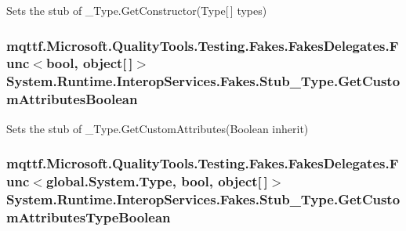 Sets the stub of \-\_\-\-Type.\-Get\-Constructor(\-Type\mbox{[}$\,$\mbox{]} types)

\hypertarget{class_system_1_1_runtime_1_1_interop_services_1_1_fakes_1_1_stub___type_acd63edf0bfa188ae04cbf8a2221e6792}{
\subsubsection[{Get\-Custom\-Attributes\-Boolean}]{\setlength{\rightskip}{0pt plus 5cm}mqttf.\-Microsoft.\-Quality\-Tools.\-Testing.\-Fakes.\-Fakes\-Delegates.\-Func$<$bool, object\mbox{[}$\,$\mbox{]}$>$ System.\-Runtime.\-Interop\-Services.\-Fakes.\-Stub\-\_\-\-Type.\-Get\-Custom\-Attributes\-Boolean}}\label{class_system_1_1_runtime_1_1_interop_services_1_1_fakes_1_1_stub___type_acd63edf0bfa188ae04cbf8a2221e6792}


Sets the stub of \-\_\-\-Type.\-Get\-Custom\-Attributes(\-Boolean inherit)

\hypertarget{class_system_1_1_runtime_1_1_interop_services_1_1_fakes_1_1_stub___type_ab929472be2f240ceda92abd43348cee6}{
\subsubsection[{Get\-Custom\-Attributes\-Type\-Boolean}]{\setlength{\rightskip}{0pt plus 5cm}mqttf.\-Microsoft.\-Quality\-Tools.\-Testing.\-Fakes.\-Fakes\-Delegates.\-Func$<$global.\-System.\-Type, bool, object\mbox{[}$\,$\mbox{]}$>$ System.\-Runtime.\-Interop\-Services.\-Fakes.\-Stub\-\_\-\-Type.\-Get\-Custom\-Attributes\-Type\-Boolean}}\label{class_system_1_1_runtime_1_1_interop_services_1_1_fakes_1_1_stub___type_ab929472be2f240ceda92abd43348cee6}


